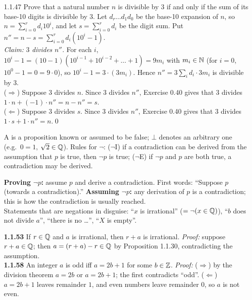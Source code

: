 \begin{bookex}[essential]{1.1.47}
Prove that a natural number $n$ is divisible by $3$ if and only if the sum of its base-10 digits is divisible by $3$.
\solution
Let $d_r\dots d_1d_0$ be the base-10 expansion of $n$, so $n=\sum_{i=0}^rd_i10^i$, and let $s=\sum_{i=0}^rd_i$ be the digit sum. Put $n''=n-s=\sum_{i=0}^rd_i(10^i-1)$.\\
\emph{Claim: $3$ divides $n''$.} For each $i$, $10^i-1=(10-1)(10^{i-1}+10^{i-2}+\dots+1)=9m_i$ with $m_i\in\mathbb{N}$ (for $i=0$, $10^0-1=0=9\cdot0$), so $10^i-1=3\cdot(3m_i)$. Hence $n''=3\sum_id_i\cdot3m_i$ is divisible by $3$.\\
($\Rightarrow$) Suppose $3$ divides $n$. Since $3$ divides $n''$, Exercise 0.40 gives that $3$ divides $1\cdot n+(-1)\cdot n''=n-n''=s$.\\
($\Leftarrow$) Suppose $3$ divides $s$. Since $3$ divides $n''$, Exercise 0.40 gives that $3$ divides $1\cdot s+1\cdot n''=n$.\qed
\end{bookex}

\begin{key}
A  is a proposition known or assumed to be false; $\bot$ denotes an arbitrary one (e.g.\ $0=1$, $\sqrt2\in\mathbb{Q}$). Rules for $\neg$: ($\neg$I) if a contradiction can be derived from the assumption that $p$ is true, then $\neg p$ is true; ($\neg$E) if $\neg p$ and $p$ are both true, a contradiction may be derived.
\end{key}
\begin{strategy}
\textbf{Proving $\neg p$:} assume $p$ and derive a contradiction. First words: ``Suppose $p$ (towards a contradiction).'' \textbf{Assuming $\neg p$:} any derivation of $p$ is a contradiction; this is how the contradiction is usually reached.\\
Statements that are negations in disguise: ``$x$ is irrational'' ($=\neg(x\in\mathbb{Q})$), ``$b$ does not divide $a$'', ``there is no \dots'', ``$X$ is empty''.
\end{strategy}
\begin{result}
\textbf{1.1.53} If $r\in\mathbb{Q}$ and $a$ is irrational, then $r+a$ is irrational. \emph{Proof:} suppose $r+a\in\mathbb{Q}$; then $a=(r+a)-r\in\mathbb{Q}$ by Proposition 1.1.30, contradicting the assumption. \\
\textbf{1.1.58} An integer $a$ is odd iff $a=2b+1$ for some $b\in\mathbb{Z}$. \emph{Proof:} ($\Rightarrow$) by the division theorem $a=2b$ or $a=2b+1$; the first contradicts ``odd''. ($\Leftarrow$) $a=2b+1$ leaves remainder $1$, and even numbers leave remainder $0$, so $a$ is not even.
\end{result}

